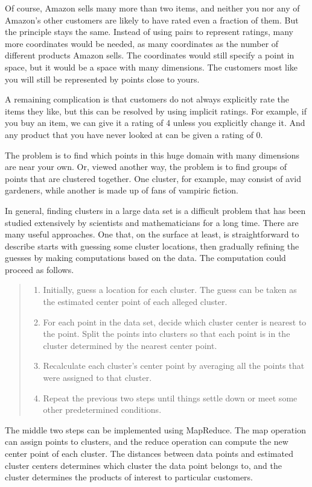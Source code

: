 Of course, Amazon sells many more than two items, and neither you nor any
of Amazon's other customers are likely to have rated even a fraction of them.
But the principle stays the same.  Instead of using pairs to represent
ratings, many more coordinates would be needed, as many coordinates 
as the number of different products Amazon sells.
The coordinates would still specify a point in space, 
but it would be a space with many dimensions.
The customers most like you will still be represented by points close to yours.

A remaining complication is that customers do not always explicitly rate the
items they like, but this can be resolved by using implicit ratings.
For example, if you buy an item, we can give it a rating of 4 unless you
explicitly change it.  And any product that you have never looked at
can be given a rating of 0.

The problem is to find which points in this huge domain with many dimensions
are near your own. Or, viewed another way, the problem is to find groups of
points that are clustered together. One cluster, for example, may consist of
avid gardeners, while another is made up of fans of vampiric fiction.

In general, finding clusters 
in a large data set is a difficult problem
that has been studied extensively 
by scientists and mathematicians for a long time.
There are many useful approaches.  One that, on the surface at least,
is straightforward to describe starts with guessing some cluster locations,
then gradually refining the guesses by making computations based on the data.
The computation could proceed as follows.
\begin{quote}
\label{cluster-process}
\begin{enumerate}
    \item Initially, guess a location for each cluster. The guess can be
        taken as the estimated center point of each alleged cluster.
    \item For each point in the data set, decide which cluster center is nearest
        to the point.  Split the points into clusters so that each point is
        in the cluster determined by the nearest center point.
    \item Recalculate each cluster's center point by averaging all the
        points that were assigned to that cluster.
    \item Repeat the previous two steps until things settle down or meet
        some other predetermined conditions.
\end{enumerate}
\end{quote}
The middle two steps can be implemented using MapReduce.  The map operation can
assign points to clusters, and the reduce operation can compute the new center
point of each cluster.  The distances between data points
and estimated cluster centers determines which cluster the data point belongs to,
and the cluster determines the products of interest to particular customers.

